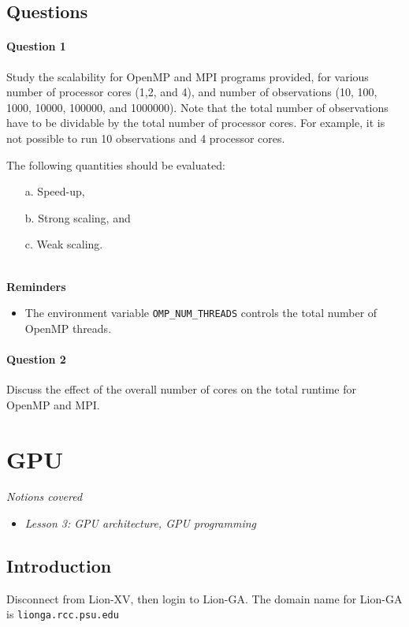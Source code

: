 \documentclass[letterpaper,10pt]{article}
\begin{document}
 
\subsection{Questions}
\paragraph{Question 1} Study the scalability for OpenMP and MPI programs provided, for various number of processor cores (1,2, and 4), and number of observations (10, 100, 1000, 10000, 100000, and 1000000). Note that the total number
of observations have to be dividable by the total number of processor cores. For example, it is not possible to run 10 observations and 4 processor cores. 

The following quantities should be evaluated:
\begin{itemize}
 \item[a.] Speed-up,
 \item[b.] Strong scaling, and
 \item[c.] Weak scaling.
\end{itemize}

~\\
\textbf{Reminders}
\begin{itemize}
 \item The environment variable \texttt{OMP\_NUM\_THREADS} controls the total number of OpenMP threads.
\end{itemize}


\paragraph{Question 2} Discuss the effect of the overall number of cores on the total runtime for OpenMP and MPI.










\newpage




\section{GPU}
\textit{Notions covered}
\begin{itemize}
 \item \textit{Lesson 3: GPU architecture, GPU programming}
\end{itemize}

\subsection{Introduction}
Disconnect from Lion-XV, then login to Lion-GA. The domain name for Lion-GA is \texttt{lionga.rcc.psu.edu}
\end{document}
